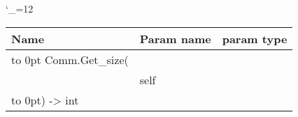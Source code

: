 \begingroup \catcode`\_=12 \tt
\begin{tabular}{lll}
\toprule
\textrm{Name}&\textrm{Param name}&\textrm{param type}\\
\midrule
\hbox to 0pt {Comm.Get_size(\hss}\\
& self\\
\hbox to 0pt{) -> int\hss}\\
\bottomrule
\end{tabular}
\endgroup
